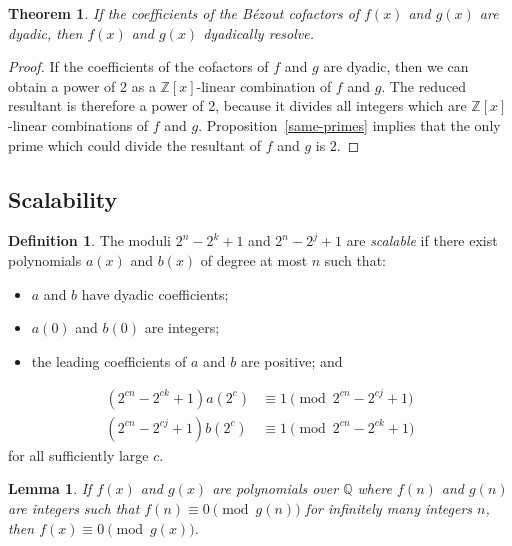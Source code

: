 \documentclass[]{article}
\newtheorem{lemma}{Lemma}[section]
\newtheorem{theorem}{Theorem}[section]
\theoremstyle{definition}
\newtheorem{definition}{Definition}
\begin{document}
\begin{theorem}
    If the coefficients of the B\'ezout cofactors of $f(x)$ and $g(x)$ are
    dyadic, then $f(x)$ and $g(x)$ dyadically resolve.
\end{theorem}

\begin{proof}
    If the coefficients of the cofactors of $f$ and $g$ are dyadic, then we can
    obtain a power of 2 as a $\mathbb{Z}[x]$-linear combination of $f$ and $g$.
    The reduced resultant is therefore a power of 2, because it divides all
    integers which are $\mathbb{Z}[x]$-linear combinations of $f$ and $g$.
    Proposition~\ref{same-primes} implies that the only prime which could
    divide the resultant of $f$ and $g$ is $2$.
\end{proof}

\subsection{Scalability}

\begin{definition}
    \label{scalable-def}
    The moduli $2^n - 2^k + 1$ and $2^n - 2^j + 1$ are \emph{scalable} if there
    exist polynomials $a(x)$ and $b(x)$ of degree at most $n$ such that:
    \begin{itemize}
        \item $a$ and $b$ have dyadic coefficients;
        \item $a(0)$ and $b(0)$ are integers;
        \item the leading coefficients of $a$ and $b$ are positive; and
    \end{itemize}
    \begin{align*}
        (2^{cn} - 2^{ck} + 1) a(2^c) &\equiv 1 \pmod{2^{cn} - 2^{cj} + 1} \\
        (2^{cn} - 2^{cj} + 1) b(2^c) &\equiv 1 \pmod{2^{cn} - 2^{ck} + 1}
    \end{align*}
    for all sufficiently large $c$.
\end{definition}

\begin{lemma}
    If $f(x)$ and $g(x)$ are polynomials over $\mathbb{Q}$ where
    $f(n)$ and $g(n)$ are integers such that $f(n) \equiv 0 \pmod{g(n)}$ for
    infinitely many integers $n$, then $f(x) \equiv 0 \pmod{g(x)}$.
\end{lemma}
\end{document}

